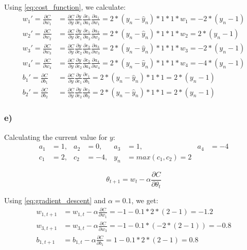 Using \cref{eq:cost_function}, we calculate: 
\begin{align*}
        w_1' = \frac{ \partial C}{\partial w_1} 
    &= \frac{\partial C}{\partial y} \frac{\partial y}{\partial c_1} 
    \frac{\partial c_1}{\partial a_1} \frac{\partial a_1}{\partial w_1}
    = 2 * (y_n - \hat{y}_n) * 1 * 1 * w_1 = - 2 * (y_n - 1) \\
        w_2' = \frac{\partial C}{\partial w_2} 
    &= \frac{\partial C}{\partial y} \frac{\partial y}{\partial c_1} 
    \frac{\partial c_1}{\partial a_2} \frac{\partial a_2}{\partial w_2}
    = 2 * (y_n - \hat{y}_n) * 1 * 1 * w_2 = 2 * (y_n - 1) \\
        w_3' = \frac{\partial C}{\partial w_3} 
    &= \frac{\partial C}{\partial y} \frac{\partial y}{\partial c_2} 
    \frac{\partial c_2}{\partial a_3} \frac{\partial a_3}{\partial w_3}
    = 2 * (y_n - \hat{y}_n) * 1 * 1 * w_3 = - 2 * (y_n - 1) \\
        w_4' = \frac{\partial C}{\partial w_4} 
    &= \frac{\partial C}{\partial y} \frac{\partial y}{\partial c_2} 
    \frac{\partial c_2}{\partial a_4} \frac{\partial a_4}{\partial w_4}
    = 2 * (y_n - \hat{y}_n) * 1 * 1 * w_4 = - 4 * (y_n - 1) \\
        b_1' = \frac{\partial C}{\partial b_1} 
    &= \frac{\partial C}{\partial y} \frac{\partial y}{\partial c_1} 
    \frac{\partial c_1}{\partial b_1} 
    = 2 * (y_n - \hat{y}_n) * 1 * 1 = 2 * (y_n - 1) \\ 
        b_2' = \frac{\partial C}{\partial b_2}
    &= \frac{\partial C}{\partial y} \frac{\partial y}{\partial c_2} 
    \frac{\partial c_2}{\partial b_2} 
    = 2 * (y_n - \hat{y}_n) * 1 * 1 = 2 * (y_n - 1) 
\end{align*}

\subsubsection*{e)}
Calculating the current value for $y$: 
\begin{align*}
    a_1 &= 1,& a_2 &= 0,& a_3 &= 1,& a_4 &= -4 \\
    c_1 &= 2,& c_2 &= -4,& y_n  &= max(c_1, c_2) = 2
\end{align*}

\begin{equation}
    \label{eq:gradient_descent}
    \theta_{t+1} = w_t - \alpha \frac{\partial C}{\partial \theta_t}
\end{equation}

Using \cref{eq:gradient_descent} and $\alpha = 0.1$, we get: 
\begin{align*}
    w_{1, t + 1} 
    &= w_{1, t} - \alpha \frac{ \partial C}{\partial w_1} 
     = -1 - 0.1 * 2 * (2 - 1) = -1.2 \\
    w_{3, t + 1} 
    &= w_{3, t} - \alpha \frac{ \partial C}{\partial w_3} 
     = -1 - 0.1 * (- 2 * (2 - 1)) = - 0.8 \\
    b_{1, t + 1} 
    &= b_{1, t} - \alpha \frac{ \partial C}{\partial b_1} 
     = 1 - 0.1 * 2 * (2 - 1) = 0.8
\end{align*}

